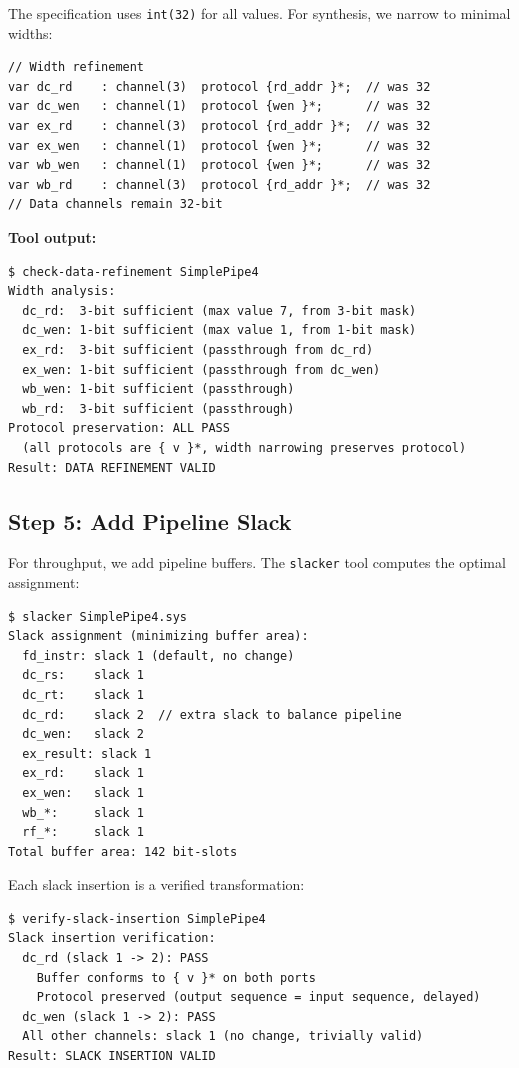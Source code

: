 \documentclass[11pt]{article}
\begin{document}
The specification uses \texttt{int(32)} for all values.  For
synthesis, we narrow to minimal widths:

\begin{Verbatim}[samepage=true]
// Width refinement
var dc_rd    : channel(3)  protocol {rd_addr }*;  // was 32
var dc_wen   : channel(1)  protocol {wen }*;      // was 32
var ex_rd    : channel(3)  protocol {rd_addr }*;  // was 32
var ex_wen   : channel(1)  protocol {wen }*;      // was 32
var wb_wen   : channel(1)  protocol {wen }*;      // was 32
var wb_rd    : channel(3)  protocol {rd_addr }*;  // was 32
// Data channels remain 32-bit
\end{Verbatim}

\textbf{Tool output:}
\begin{Verbatim}[samepage=true]
$ check-data-refinement SimplePipe4
Width analysis:
  dc_rd:  3-bit sufficient (max value 7, from 3-bit mask)
  dc_wen: 1-bit sufficient (max value 1, from 1-bit mask)
  ex_rd:  3-bit sufficient (passthrough from dc_rd)
  ex_wen: 1-bit sufficient (passthrough from dc_wen)
  wb_wen: 1-bit sufficient (passthrough)
  wb_rd:  3-bit sufficient (passthrough)
Protocol preservation: ALL PASS
  (all protocols are { v }*, width narrowing preserves protocol)
Result: DATA REFINEMENT VALID
\end{Verbatim}

\subsection{Step 5: Add Pipeline Slack}

For throughput, we add pipeline buffers.  The \texttt{slacker} tool
computes the optimal assignment:

\begin{Verbatim}[samepage=true]
$ slacker SimplePipe4.sys
Slack assignment (minimizing buffer area):
  fd_instr: slack 1 (default, no change)
  dc_rs:    slack 1
  dc_rt:    slack 1
  dc_rd:    slack 2  // extra slack to balance pipeline
  dc_wen:   slack 2
  ex_result: slack 1
  ex_rd:    slack 1
  ex_wen:   slack 1
  wb_*:     slack 1
  rf_*:     slack 1
Total buffer area: 142 bit-slots
\end{Verbatim}

Each slack insertion is a verified transformation:

\begin{Verbatim}[samepage=true]
$ verify-slack-insertion SimplePipe4
Slack insertion verification:
  dc_rd (slack 1 -> 2): PASS
    Buffer conforms to { v }* on both ports
    Protocol preserved (output sequence = input sequence, delayed)
  dc_wen (slack 1 -> 2): PASS
  All other channels: slack 1 (no change, trivially valid)
Result: SLACK INSERTION VALID
\end{Verbatim}
\end{document}
